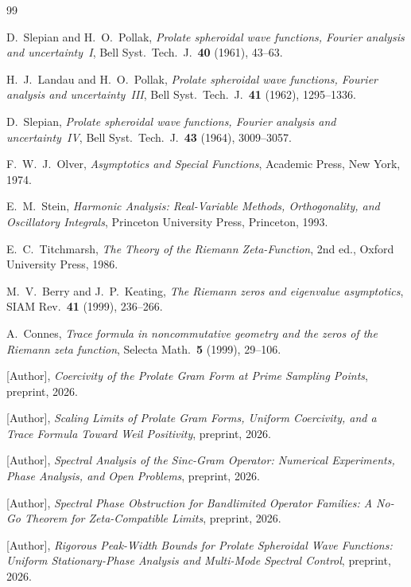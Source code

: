 \documentclass[12pt,a4paper]{amsart}
\theoremstyle{remark}
\begin{document}
\begin{thebibliography}{99}

D.~Slepian and H.~O.~Pollak,
\emph{Prolate spheroidal wave functions, Fourier analysis and uncertainty~I},
Bell Syst.\ Tech.\ J.\ \textbf{40} (1961), 43--63.

H.~J.~Landau and H.~O.~Pollak,
\emph{Prolate spheroidal wave functions, Fourier analysis and uncertainty~III},
Bell Syst.\ Tech.\ J.\ \textbf{41} (1962), 1295--1336.

D.~Slepian,
\emph{Prolate spheroidal wave functions, Fourier analysis and uncertainty~IV},
Bell Syst.\ Tech.\ J.\ \textbf{43} (1964), 3009--3057.

F.~W.~J.~Olver,
\emph{Asymptotics and Special Functions},
Academic Press, New York, 1974.

E.~M.~Stein,
\textit{Harmonic Analysis: Real-Variable Methods,
Orthogonality, and Oscillatory Integrals},
Princeton University Press, Princeton, 1993.

E.~C.~Titchmarsh,
\emph{The Theory of the Riemann Zeta-Function},
2nd ed., Oxford University Press, 1986.

M.~V.~Berry and J.~P.~Keating,
\emph{The Riemann zeros and eigenvalue asymptotics},
SIAM Rev.\ \textbf{41} (1999), 236--266.

A.~Connes,
\emph{Trace formula in noncommutative geometry and the zeros of
the Riemann zeta function},
Selecta Math.\ \textbf{5} (1999), 29--106.

[Author],
\textit{Coercivity of the Prolate Gram Form at Prime
Sampling Points}, preprint, 2026.

[Author],
\textit{Scaling Limits of Prolate Gram Forms, Uniform
Coercivity, and a Trace Formula Toward Weil
Positivity}, preprint, 2026.

[Author],
\textit{Spectral Analysis of the Sinc-Gram Operator:
Numerical Experiments, Phase Analysis, and Open
Problems}, preprint, 2026.

[Author],
\textit{Spectral Phase Obstruction for Bandlimited
Operator Families: A No-Go Theorem for
Zeta-Compatible Limits}, preprint, 2026.

[Author],
\textit{Rigorous Peak-Width Bounds for Prolate
Spheroidal Wave Functions: Uniform Stationary-Phase
Analysis and Multi-Mode Spectral Control},
preprint, 2026.

\end{thebibliography}
\end{document}
